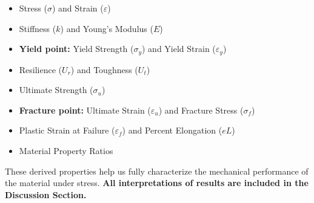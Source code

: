 \documentclass{article}
\begin{document}
{\begin{itemize}
        \item Stress ($\sigma$) and Strain ($\varepsilon$)
        \item Stiffness ($k$) and Young's Modulus ($E$)
        \item \textbf{Yield point:} Yield Strength ($\sigma_y$) and Yield Strain ($\varepsilon_y$)
        \item Resilience ($U_r$) and Toughness ($U_t$)
        \item Ultimate Strength ($\sigma_u$)
        \item \textbf{Fracture point:} Ultimate Strain ($\varepsilon_u$) and Fracture Stress ($\sigma_f$)
        \item Plastic Strain at Failure ($\varepsilon_f$) and Percent Elongation ($eL$)  
        \item Material Property Ratios
    \end{itemize}
    These derived properties help us fully characterize the mechanical performance of the material under stress. \textbf{All interpretations of results are included in the Discussion Section.}
    \newpage
}
\end{document}

